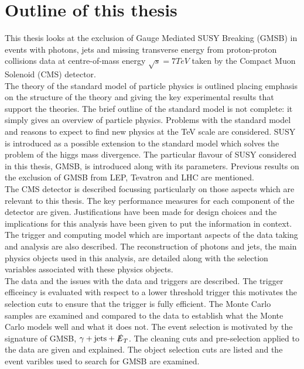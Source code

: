 \section{Outline of this thesis}

This thesis looks at the exclusion of Gauge Mediated SUSY Breaking (GMSB) in
events with photons, jets and missing transverse energy from proton-proton
collisions data at centre-of-mass energy $\sqrt{s}=7\unit{TeV}$ taken by the
Compact Muon Solenoid (CMS) detector. \\

The theory of the standard model of particle physics is outlined placing
emphasis on the structure of the theory and giving the key experimental results
that support the theories. The brief outline of the standard model is not
complete: it simply gives an overview of particle physics. Problems with the
standard model and reasons to expect to find new physics at the TeV scale are
considered. SUSY is introduced as a possible extension to the standard model
which solves the problem of the higgs mass divergence. The particular flavour of
SUSY considered in this thesis, GMSB, is introduced along with its parameters.
Previous results on the exclusion of GMSB from LEP, Tevatron and LHC are
mentioned. \\

The CMS detector is described focussing particularly on those aspects which are
relevant to this thesis. The key performance measures for each component of the
detector are given. Justifications have been made for design choices and the 
implications for this analysis have been given to put the information in 
context. The trigger and computing model which are important aspects of the data
taking and analysis are also described. The reconstruction of photons and jets,
the main physics objects used in this analysis, are detailed along with the
selection variables associated with these physics objects. \\

The data and the issues with the data and triggers are described. The trigger
efficeincy is evaluated with respect to a lower threshold trigger this motivates
the selection cuts to ensure that the trigger is fully efficient. The Monte 
Carlo samples are examined and compared to the data to establish what the Monte
Carlo models well and what it does not. The event selection is motivated by the 
signature of GMSB, $\gamma+\mbox{jets}+\slashed{E}_{T}$. The cleaning cuts and 
pre-selection applied to the data are given and explained. The object selection 
cuts are listed and the event varibles used to search for GMSB are examined. \\

